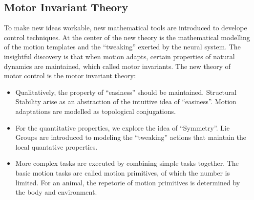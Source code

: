 \subsection{Motor Invariant Theory}
%
%
%
To make new ideas workable, new mathematical tools are introduced to develope control techniques.
At the center of the new theory is the mathematical modelling of the motion templates and the ``tweaking'' exerted by the neural system.
The insightful discovery is that when motion adapts, certain properties of natural dynamics are maintained, which called motor invariants.
The new theory of motor control is the motor invariant theory:
\begin{itemize}

\item Qualitatively, the property of ``easiness'' should be maintained.
Structural Stability arise as an abstraction of the intuitive idea of ``easiness''.
Motion adaptations are modelled as topological conjugations. 

\item For the quantitative properties, we explore the idea of ``Symmetry''.
Lie Groups are introduced to modeling the ``tweaking'' actions that maintain the local quantative properties.


\item More complex tasks are executed by combining simple tasks together.
The basic motion tasks are called motion primitives, of which the number is limited.
For an animal, the repetorie of motion primitives is determined by the body and environment.
\end{itemize}

